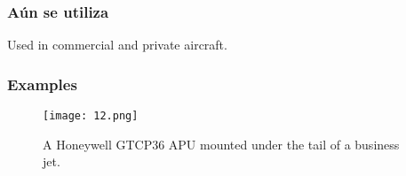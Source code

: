 \documentclass[12pt, letterpaper]{article}
\begin{document}
\subsubsection*{Aún se utiliza}
Used in commercial and private aircraft.
\subsubsection*{Examples}
\begin{figure}[H]
	\centering
	\texttt{[image: 12.png]}
	\caption{A Honeywell GTCP36 APU mounted under the tail of a business jet.}
\end{figure}
\renewcommand\refname{References}
\printbibliography
\end{document}
